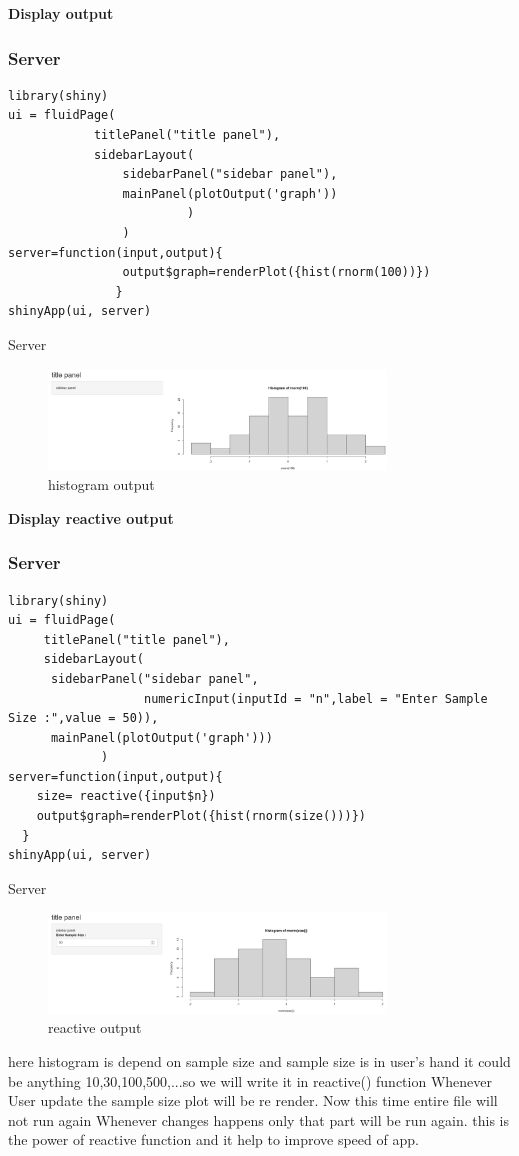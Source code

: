\documentclass[aspectratio=169,serif,professionalfont]{beamer}
\begin{document}
\begin{frame}[fragile]
  \textbf{Display output }
  \frametitle{Server}
\begin{verbatim}
library(shiny)         
ui = fluidPage(
            titlePanel("title panel"),
            sidebarLayout(
                sidebarPanel("sidebar panel"),
                mainPanel(plotOutput('graph'))
                         )
                )
server=function(input,output){
                output$graph=renderPlot({hist(rnorm(100))})
               }
shinyApp(ui, server)                
\end{verbatim}
\end{frame}
\begin{frame}{Server}
\begin{figure}[htbp]
    \centering
    \includegraphics[width=0.8\textwidth]{histogram_output.png}
    \caption{histogram output}
    \label{fig:image_label3}
\end{figure}
\end{frame}

\begin{frame}[fragile]
  \textbf{Display reactive output}
  \frametitle{Server}
\begin{verbatim}
library(shiny)
ui = fluidPage(
     titlePanel("title panel"),
     sidebarLayout(
      sidebarPanel("sidebar panel",
                   numericInput(inputId = "n",label = "Enter Sample Size :",value = 50)),
      mainPanel(plotOutput('graph')))
             )
server=function(input,output){
    size= reactive({input$n})
    output$graph=renderPlot({hist(rnorm(size()))})
  }
shinyApp(ui, server)             
\end{verbatim}
\end{frame}
\begin{frame}{Server}
\begin{figure}[htbp]
    \centering
    \includegraphics[width=0.8\textwidth]{reactive_output.png}
    \caption{reactive output}
    \label{fig:image_label4}
\end{figure}
here histogram is depend on sample size and sample size is in user's hand it could be anything 10,30,100,500,...so we will write it in reactive({}) function Whenever User update the sample size plot will be re render. Now this time entire file will not run again Whenever changes happens only that part will be run again. this is the power of reactive function and it help to improve speed of app.
\end{frame}
\end{document}
